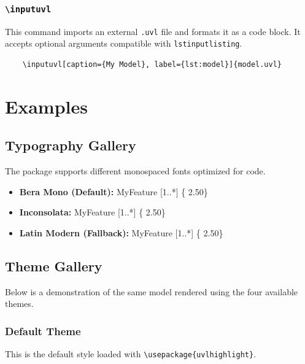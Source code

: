\subsubsection{\texttt{\textbackslash inputuvl}}
This command imports an external \texttt{.uvl} file and formats it as a \UVL code block.
It accepts optional arguments compatible with \texttt{lstinputlisting}.

\begin{verbatim}
    \inputuvl[caption={My Model}, label={lst:model}]{model.uvl}
\end{verbatim}

\section{Examples}

\subsection{Typography Gallery}
The package supports different monospaced fonts optimized for code.

\begin{itemize}
    \item \textbf{Bera Mono (Default):} {\selectfont\small MyFeature  [1..*] \{ 2.50\}}
    \item \textbf{Inconsolata:} {\selectfont\small MyFeature  [1..*] \{ 2.50\}}
    \item \textbf{Latin Modern (Fallback):} {\selectfont\small MyFeature  [1..*] \{ 2.50\}}
\end{itemize}

\subsection{Theme Gallery}
Below is a demonstration of the same \UVL model rendered using the four available themes.


\subsubsection{Default Theme}
This is the default style loaded with \texttt{\textbackslash usepackage\{uvlhighlight\}}.

